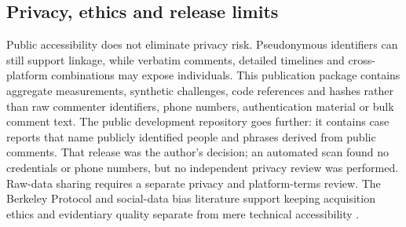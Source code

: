 \subsection{Privacy, ethics and release limits}
Public accessibility does not eliminate privacy risk. Pseudonymous identifiers can still support linkage, while verbatim comments, detailed timelines and cross-platform combinations may expose individuals. This publication package contains aggregate measurements, synthetic challenges, code references and hashes rather than raw commenter identifiers, phone numbers, authentication material or bulk comment text. The public development repository goes further: it contains case reports that name publicly identified people and phrases derived from public comments. That release was the author's decision; an automated scan found no credentials or phone numbers, but no independent privacy review was performed. Raw-data sharing requires a separate privacy and platform-terms review. The Berkeley Protocol and social-data bias literature support keeping acquisition ethics and evidentiary quality separate from mere technical accessibility \citep{berkeleyProtocol2022,Olteanu2019}.
